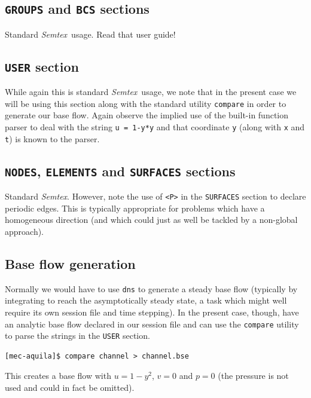 \documentclass[11pt,a4paper]{report}
\newcommand{\Semtex}{\emph{Semtex}}
\begin{document}
\subsection{\texttt{GROUPS} and \texttt{BCS} sections}

Standard \Semtex\ usage. Read that user guide!

\subsection{\texttt{USER} section}

While again this is standard \Semtex\ usage, we note that in the
present case we will be using this section along with the standard
utility \texttt{compare} in order to generate our base flow.  Again
observe the implied use of the built-in function parser to deal with
the string \verb+u = 1-y*y+ and that coordinate \verb+y+ (along with
\verb+x+ and \verb+t+) is known to the parser.

\subsection{\texttt{NODES}, \texttt{ELEMENTS} and \texttt{SURFACES} sections}

Standard \Semtex.  However, note the use of \verb+<P>+ in the
\verb+SURFACES+ section to declare periodic edges.  This is typically
appropriate for problems which have a homogeneous direction (and which
could just as well be tackled by a non-global approach).

\subsection{Base flow generation}

Normally we would have to use \texttt{dns} to generate a steady base
flow (typically by integrating to reach the asymptotically steady
state, a task which might well require its own session file and time
stepping).  In the present case, though, have an analytic base flow
declared in our session file and can use the \verb+compare+ utility to
parse the strings in the \verb+USER+ section.
{\small
\begin{verbatim}
[mec-aquila]$ compare channel > channel.bse
\end{verbatim}
} This creates a base flow with $u=1-y^2$, $v=0$ and $p=0$ (the
pressure is not used and could in fact be omitted).
\end{document}
